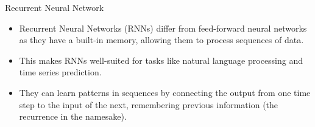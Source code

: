 \documentclass[11pt]{beamer}
\begin{document}
\begin{frame}{Recurrent Neural Network}
\begin{itemize}
\item Recurrent Neural Networks (RNNs) differ from feed-forward neural networks as they have a built-in memory, allowing them to process sequences of data. 

\item This makes RNNs well-suited for tasks like natural language processing and time series prediction. 

\item They can learn patterns in sequences by connecting the output from one time step to the input of the next, remembering previous information (the recurrence in the namesake).
\end{itemize}
\end{frame}
%
\end{document}
